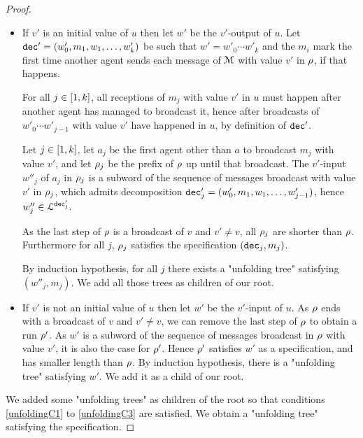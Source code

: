 \begin{proof}
	\begin{itemize}
		\item If $v'$ is an initial value of $u$ then let $w'$ be the $v'$-output of $u$. Let $\mathtt{dec}' = (w'_0, m_1, w_1, \ldots, w'_k)$ be such that $w' = w'_0 \cdots w'_k$ and the $m_i$ mark the first time another agent sends each message of $\mathcal{M}$ with value $v'$ in $\rho$, if that happens.  
		
		For all $j \in [1,k]$, all receptions of $m_j$ with value $v'$ in $u$ must happen after another agent has managed to broadcast it, hence after broadcasts of $w'_0 \cdots w'_{j-1}$ with value $v'$ have happened in $u$, by definition of $\mathtt{dec}'$.
		
		Let $j \in [1,k]$, let $a_j$ be the first agent other than $a$ to broadcast $m_j$ with value $v'$, and let $\rho_j$ be the prefix of $\rho$ up until that broadcast. The $v'$-input $w''_j$ of $a_j$ in $\rho_j$ is a subword of the sequence of messages broadcast with value $v'$ in $\rho_j$, which admits decomposition $\mathtt{dec}'_j = (w'_0, m_1, w_1, \ldots, w'_{j-1})$, hence $w''_j \in \mathcal{L}^{\mathtt{\mathtt{dec}'_j}}$.
		
		As the last step of $\rho$ is a broadcast of $v$ and $v' \neq v$, all $\rho_j$ are shorter than $\rho$. Furthermore for all $j$, $\rho_j$ satisfies the specification $(\mathtt{dec}_j, m_j)$.		
		
		By induction hypothesis, for all $j$ there exists a "unfolding tree" satisfying $(w''_j, m_j)$. We add all those trees as children of our root.
		
		\item If $v'$ is not an initial value of $u$ then let $w'$ be the $v'$-input of $u$. 
		As $\rho$ ends with a broadcast of $v$ and $v' \neq v$, we can remove the last step of $\rho$ to obtain a run $\rho'$. As $w'$ is a subword of the sequence of messages broadcast in $\rho$ with value $v'$, it is also the case for $\rho'$.
		Hence $\rho'$ satisfies $w'$ as a specification, and has smaller length than $\rho$. By induction hypothesis, there is a "unfolding tree" satisfying $w'$. We add it as a child of our root.
	\end{itemize}
	
	We added some "unfolding trees" as children of the root so that conditions \ref{unfoldingC1} to \ref{unfoldingC3} are satisfied. We obtain a "unfolding tree" satisfying the specification.
\end{proof}
